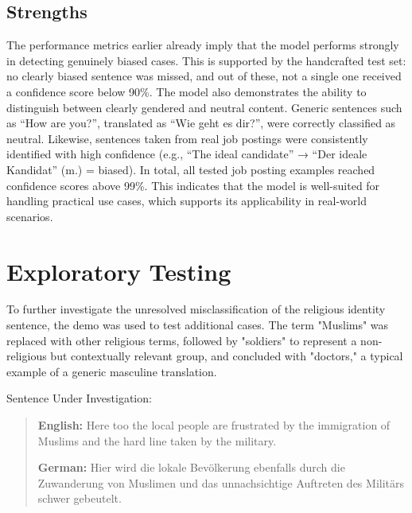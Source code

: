 \subsection{Strengths}
The performance metrics earlier already imply that the model performs strongly in detecting genuinely biased cases. This is supported by the handcrafted test set: no clearly biased sentence was missed, and out of these, not a single one received a confidence score below 90\%. The model also demonstrates the ability to distinguish between clearly gendered and neutral content. Generic sentences such as “How are you?”, translated as “Wie geht es dir?”, were correctly classified as neutral. Likewise, sentences taken from real job postings were consistently identified with high confidence (e.g., “The ideal candidate” → “Der ideale Kandidat” (m.) = biased). In total, all tested job posting examples reached confidence scores above 99\%. This indicates that the model is well-suited for handling practical use cases, which supports its applicability in real-world scenarios.

\section{Exploratory Testing} \label{section:exploratory_testing}
    To further investigate the unresolved misclassification of the religious identity sentence, the demo was used to test additional cases. The term "Muslims" was replaced with other religious terms, followed by "soldiers" to represent a non-religious but contextually relevant group, and concluded with "doctors," a typical example of a generic masculine translation.

    \vspace{0.8em}
    Sentence Under Investigation:
    \begin{quote}
    \textbf{English:} Here too the local people are frustrated by the immigration of Muslims and the hard line taken by the military.

    \textbf{German:} Hier wird die lokale Bevölkerung ebenfalls durch die Zuwanderung von Muslimen und das unnachsichtige Auftreten des Militärs schwer gebeutelt.
    \end{quote}

